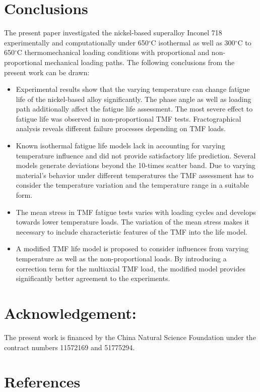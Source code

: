 \documentclass[preprint,5p,twocolumn,11pt,sort&compress]{elsarticle}
\begin{document}
\section{Conclusions}

The present paper investigated the nickel-based superalloy Inconel 718  experimentally and computationally under 650$^\circ$C isothermal as well as 300$^\circ$C to 650$^\circ$C thermomechanical loading conditions with proportional and non-proportional mechanical loading paths. The following conclusions from the present work can be drawn:

\begin{itemize}
\item Experimental results show that the varying temperature can change fatigue life of the nickel-based alloy significantly. The phase angle as well as loading path additionally affect the fatigue life assessment. The most severe effect to fatigue life was observed in non-proportional TMF tests. Fractographical analysis reveals different failure processes depending on TMF loads.

\item Known isothermal fatigue life models lack in accounting for varying temperature influence and did not provide satisfactory life prediction. Several models generate deviations beyond the 10-times scatter band. Due to varying material's behavior under different temperatures the TMF assessment has to consider the temperature variation and the temperature range in a suitable form.

\item The mean stress in TMF fatigue tests varies with loading cycles and develops towards lower temperature loads. The variation of the mean stress makes it necessary to include characteristic features of the TMF into the life model.

\item A modified TMF life model is proposed to consider influences from varying temperature as well as the non-proportional loads. By introducing a correction term for the multiaxial TMF load, the modified model provides significantly better agreement to the experiments.


\end{itemize}


\section*{Acknowledgement:} The present work is financed by the China Natural Science Foundation under the contract numbers 11572169 and 51775294.

\section*{References}

\end{document}
